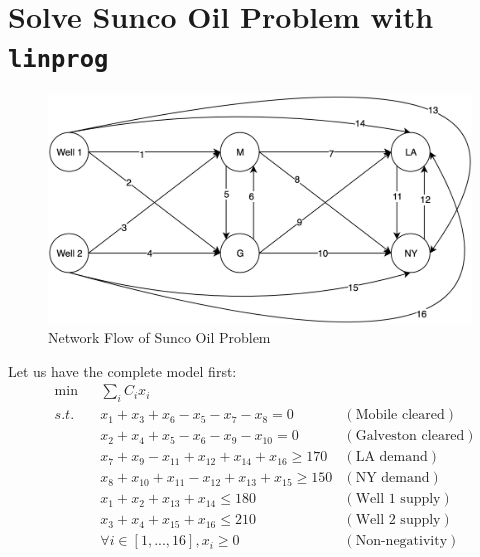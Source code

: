 



\section{Solve Sunco Oil Problem with \texttt{linprog}}

\begin{figure}[h]
    \centering
    \includegraphics[width=0.9\linewidth]{hw1/hw1-prob2-graph.png}
    \caption{Network Flow of Sunco Oil Problem}
\end{figure}

Let us have the complete model first:
\begin{align*}
&\min && \sum_i C_ix_i \\
&s.t.
 && x_1 + x_3 + x_6 - x_5 - x_7 - x_8 = 0&(\text{Mobile cleared})\\
&&&x_2 + x_4 + x_5 - x_6 - x_9 - x_{10} =  0&(\text{Galveston cleared}) \\
&&& x_7 + x_9 - x_{11} + x_{12} + x_{14} + x_{16} \geq 170 &(\text{LA demand})\\
&&& x_8 + x_{10} + x_{11} - x_{12} + x_{13} + x_{15} \geq 150 &(\text{NY demand}) \\
&&&x_1 + x_2 + x_{13} + x_{14} \leq 180 &(\text{Well 1 supply})\\
&&& x_3 + x_4 + x_{15} + x_{16} \leq 210 &(\text{Well 2 supply}) \\
&&& \forall i \in [1,...,16], x_i \geq 0 & (\text{Non-negativity})
\end{align*}

